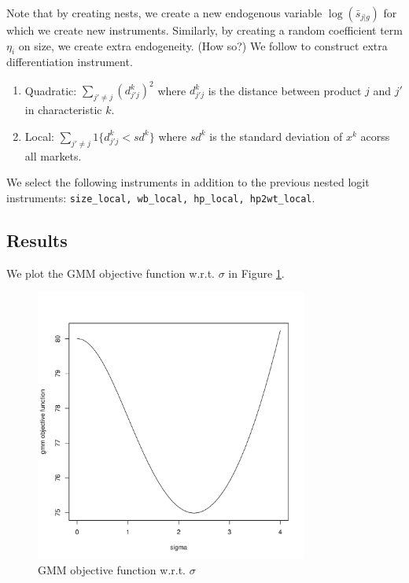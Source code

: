 \documentclass[12pt]{article}[margin=1in]
\begin{document}
Note that by creating nests, we create a new endogenous variable
$\log(\bar{s}_{j|g})$ for which we create new instruments. Similarly, by
creating a random coefficient term $\eta_i$ on size, we create extra
endogeneity. (How so?) We follow \citet{gandhihoude2019measuring} to construct
extra differentiation instrument.
\begin{enumerate}
    \item Quadratic: $\sum_{j' \neq j} (d_{j'j}^k)^2$ where $d_{j'j}^k$ is the distance
          between product $j$ and $j'$ in characteristic $k$.
    \item Local: $\sum_{j' \neq j} 1\{d_{j'j}^k < sd^k\}$ where $sd^k$ is the standard
          deviation of $x^k$ acorss all markets.
\end{enumerate}
We select the following instruments in addition to the previous nested logit
instruments: \verb|size_local, wb_local, hp_local, hp2wt_local|.

\subsection{Results}
We plot the GMM objective function w.r.t. $\sigma$ in Figure
\ref{fig:iv_local_diff}.

\begin{figure}[h!]
    \centering
    \includegraphics[width=0.8\textwidth]{../Results/Figures/gmm_obj_iv_local.pdf}
    \caption{GMM objective function w.r.t. $\sigma$}
    \label{fig:iv_local_diff}
\end{figure}
\end{document}
